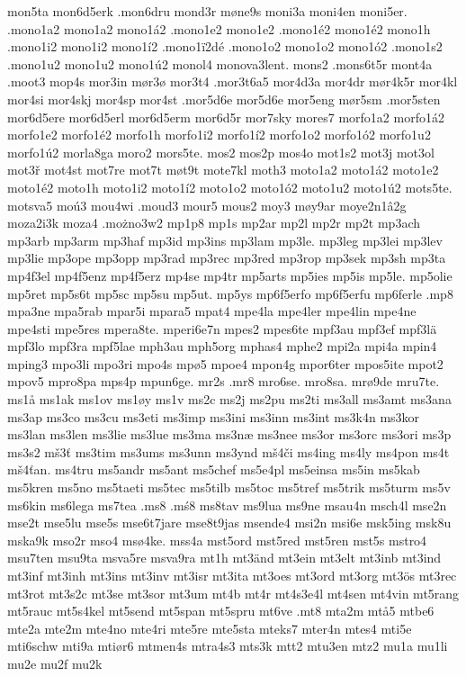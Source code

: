 {{mon5ta
mon6d5erk
.mon6dru
mond3r
møne9s
moni3a
moni4en
moni5er.
.mono1a2
mono1a2
mono1á2
.mono1e2
mono1e2
.mono1é2
mono1é2
mono1h
.mono1i2
mono1i2
mono1í2
.mono1ï2dé
.mono1o2
mono1o2
mono1ó2
.mono1s2
.mono1u2
mono1u2
mono1ú2
monol4
monova3lent.
mons2
.mons6t5r
mont4a
.moot3
mop4s
mor3in
mør3ø
mor3t4
.mor3t6a5
mor4d3a
mor4dr
mør4k5r
mor4kl
mor4si
mor4skj
mor4sp
mor4st
.mor5d6e
mor5d6e
mor5eng
mør5sm
.mor5sten
mor6d5ere
mor6d5erl
mor6d5erm
mor6d5r
mor7sky
mores7
morfo1a2
morfo1á2
morfo1e2
morfo1é2
morfo1h
morfo1i2
morfo1í2
morfo1o2
morfo1ó2
morfo1u2
morfo1ú2
morla8ga
moro2
mors5te.
mos2
mos2p
mos4o
mot1s2
mot3j
mot3ol
mot3ř
mot4st
mot7re
mot7t
møt9t
mote7kl
moth3
moto1a2
moto1á2
moto1e2
moto1é2
moto1h
moto1i2
moto1í2
moto1o2
moto1ó2
moto1u2
moto1ú2
mots5te.
motsva5
moú3
mou4wi
.moud3
mour5
mous2
moy3
møy9ar
moye2n1â2g
moza2i3k
moza4
.możno3w2
mp1p8
mp1s
mp2ar
mp2l
mp2r
mp2t
mp3ach
mp3arb
mp3arm
mp3haf
mp3id
mp3ins
mp3lam
mp3le.
mp3leg
mp3lei
mp3lev
mp3lie
mp3ope
mp3opp
mp3rad
mp3rec
mp3red
mp3rop
mp3sek
mp3sh
mp3ta
mp4f3el
mp4f5enz
mp4f5erz
mp4se
mp4tr
mp5arts
mp5ies
mp5is
mp5le.
mp5olie
mp5ret
mp5s6t
mp5sc
mp5su
mp5ut.
mp5ys
mp6f5erfo
mp6f5erfu
mp6ferle
.mp8
mpa3ne
mpa5rab
mpar5i
mpara5
mpat4
mpe4la
mpe4ler
mpe4lin
mpe4ne
mpe4sti
mpe5res
mpera8te.
mperi6e7n
mpes2
mpes6te
mpf3au
mpf3ef
mpf3lä
mpf3lo
mpf3ra
mpf5lae
mph3au
mph5org
mphas4
mphe2
mpi2a
mpi4a
mpin4
mping3
mpo3li
mpo3ri
mpo4s
mpø5
mpoe4
mpon4g
mpor6ter
mpos5ite
mpot2
mpov5
mpro8pa
mps4p
mpun6ge.
mr2s
.mr8
mro6se.
mro8sa.
mrø9de
mru7te.
ms1å
ms1ak
ms1ov
ms1øy
ms1v
ms2c
ms2j
ms2pu
ms2ti
ms3all
ms3amt
ms3ana
ms3ap
ms3co
ms3cu
ms3eti
ms3imp
ms3ini
ms3inn
ms3int
ms3k4n
ms3kor
ms3lan
ms3len
ms3lie
ms3lue
ms3ma
ms3næ
ms3nee
ms3or
ms3orc
ms3ori
ms3p
ms3s2
mš3ť
ms3tim
ms3ums
ms3unn
ms3ynd
mš4či
ms4ing
ms4ly
ms4pon
ms4t
mš4ťan.
ms4tru
ms5andr
ms5ant
ms5chef
ms5e4pl
ms5einsa
ms5in
ms5kab
ms5kren
ms5no
ms5taeti
ms5tec
ms5tilb
ms5toc
ms5tref
ms5trik
ms5turm
ms5v
ms6kin
ms6lega
ms7tea
.ms8
.mś8
ms8tav
ms9lua
ms9ne
msau4n
msch4l
mse2n
mse2t
mse5lu
mse5s
mse6t7jare
mse8t9jas
msende4
msi2n
msi6e
msk5ing
msk8u
mska9k
mso2r
mso4
msø4ke.
mss4a
mst5ord
mst5red
mst5ren
mst5s
mstro4
msu7ten
msu9ta
msva5re
msva9ra
mt1h
mt3änd
mt3ein
mt3elt
mt3inb
mt3ind
mt3inf
mt3inh
mt3ins
mt3inv
mt3isr
mt3ita
mt3oes
mt3ord
mt3org
mt3ös
mt3rec
mt3rot
mt3s2c
mt3se
mt3sor
mt3um
mt4b
mt4r
mt4s3e4l
mt4sen
mt4vin
mt5rang
mt5rauc
mt5s4kel
mt5send
mt5span
mt5spru
mt6ve
.mt8
mta2m
mtå5
mtbe6
mte2a
mte2m
mte4no
mte4ri
mte5re
mte5sta
mteks7
mter4n
mtes4
mti5e
mti6schw
mti9a
mtiør6
mtmen4s
mtra4s3
mts3k
mtt2
mtu3en
mtz2
mu1a
mu1li
mu2e
mu2f
mu2k
}}
